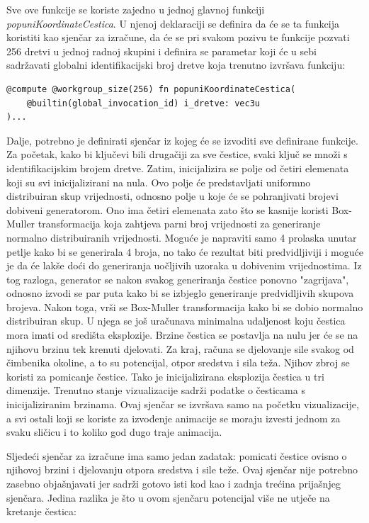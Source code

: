 \documentclass{foi}
\begin{document}
Sve ove funkcije se koriste zajedno u jednoj glavnoj funkciji \textit{popuniKoordinateCestica}. U njenoj deklaraciji se definira da će se ta funkcija koristiti kao sjenčar za izračune, da će se pri svakom pozivu te funkcije pozvati 256 dretvi u jednoj radnoj skupini i definira se parametar koji će u sebi sadržavati globalni identifikacijski broj dretve koja trenutno izvršava funkciju:

\begin{verbatim}
@compute @workgroup_size(256) fn popuniKoordinateCestica(
	@builtin(global_invocation_id) i_dretve: vec3u
)...
\end{verbatim}

Dalje, potrebno je definirati sjenčar iz kojeg će se izvoditi sve definirane funkcije. Za početak, kako bi ključevi bili drugačiji za sve čestice, svaki ključ se množi s identifikacijskim brojem dretve. Zatim, inicijalizira se polje od četiri elemenata koji su svi inicijalizirani na nula. Ovo polje će predstavljati uniformno distribuiran skup vrijednosti, odnosno polje u koje će se pohranjivati brojevi dobiveni generatorom. Ono ima četiri elemenata zato što se kasnije koristi Box-Muller transformacija koja zahtjeva parni broj vrijednosti za generiranje normalno distribuiranih vrijednosti. Moguće je napraviti samo 4 prolaska unutar petlje kako bi se generirala 4 broja, no tako će rezultat biti predvidljiviji i moguće je da će lakše doći do generiranja uočljivih uzoraka u dobivenim vrijednostima. Iz tog razloga, generator se nakon svakog generiranja čestice ponovno "zagrijava", odnosno izvodi se par puta kako bi se izbjeglo generiranje predvidljivih skupova brojeva. Nakon toga, vrši se Box-Muller transformacija kako bi se dobio normalno distribuiran skup. U njega se još uračunava minimalna udaljenost koju čestica mora imati od središta eksplozije. Brzine čestica se postavlja na nulu jer će se na njihovu brzinu tek krenuti djelovati. Za kraj, računa se djelovanje sile svakog od čimbenika okoline, a to su potencijal, otpor sredstva i sila teža. Njihov zbroj se koristi za pomicanje čestice. Tako je inicijalizirana eksplozija čestica u tri dimenzije. Trenutno stanje vizualizacije sadrži podatke o česticama s inicijaliziranim brzinama. Ovaj sjenčar se izvršava samo na početku vizualizacije, a svi ostali koji se koriste za izvođenje animacije se moraju izvesti jednom za svaku sličicu i to koliko god dugo traje animacija. 

Sljedeći sjenčar za izračune ima samo jedan zadatak: pomicati čestice ovisno o njihovoj brzini i djelovanju otpora sredstva i sile teže. Ovaj sjenčar nije potrebno zasebno objašnjavati jer sadrži gotovo isti kod kao i zadnja trećina prijašnjeg sjenčara. Jedina razlika je što u ovom sjenčaru potencijal više ne utječe na kretanje čestica:
\end{document}
